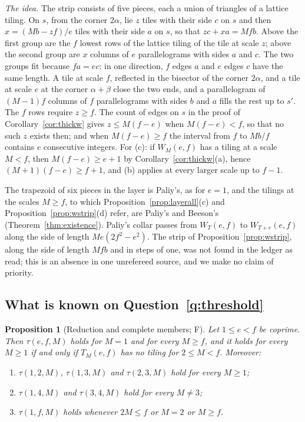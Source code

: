 \documentclass[11pt,reqno]{amsart}
\theoremstyle{plain}
\newtheorem{proposition}[theorem]{Proposition}
\theoremstyle{definition}
\newcommand{\sF}{\textup{\textsf{F}}}
\begin{document}
\emph{The idea.} The strip consists of five pieces, each a union of triangles of a lattice tiling. On $s$,
from the corner $2\alpha$, lie $z$ tiles with their side $c$ on $s$ and then $x=(Mb-zf)/e$ tiles with their
side $a$ on $s$, so that $zc+xa=Mfb$. Above the first group are the $f$ lowest rows of the lattice tiling of
the tile at scale $z$; above the second group are $x$ columns of $e$ parallelograms with sides $a$ and $c$.
The two groups fit because $fa=ec$: in one direction, $f$ edges $a$ and $e$ edges $c$ have the same length. A
tile at scale $f$, reflected in the bisector of the corner $2\alpha$, and a tile at scale $e$ at the corner
$\alpha+\beta$ close the two ends, and a parallelogram of $(M-1)f$ columns of $f$ parallelograms with sides
$b$ and $a$ fills the rest up to $s'$. The $f$ rows require $z\ge f$. The count of edges on $s$ in the proof
of Corollary~\ref{cor:thickw} gives $z\le M(f-e)$ when $M(f-e)<f$, so that no such $z$ exists then; and when
$M(f-e)\ge f$ the interval from $f$ to $Mb/f$ contains $e$ consecutive integers. For \textup{(c)}: if
$W_M(e,f)$ has a tiling at a scale $M<f$, then $M(f-e)\ge e+1$ by Corollary~\ref{cor:thickw}\textup{(a)},
hence $(M+1)(f-e)\ge f+1$, and \textup{(b)} applies at every larger scale up to $f-1$.

The trapezoid of six pieces in the layer is Paliy's, as for $e=1$, and the tilings at the scales $M\ge f$, to
which Proposition~\ref{prop:layerall}\textup{(c)} and Proposition~\ref{prop:wstrip}\textup{(d)} refer, are
Paliy's and Beeson's (Theorem~\ref{thm:existence}). Paliy's collar passes from $W_T(e,f)$ to $W_{T+e}(e,f)$
along the side of length $Me(2f^2-e^2)$. The strip of Proposition~\ref{prop:wstrip}, along the side of length
$Mfb$ and in steps of one, was not found in the ledger \cite{PaliyLedger} as read; this is an absence in one
unrefereed source, and we make no claim of priority.

\subsection{What is known on Question~\ref{q:threshold}}

\begin{proposition}[Reduction and complete members; \sF]\label{prop:finite}
Let $1\le e<f$ be coprime. Then $\tau(e,f,M)$ holds for $M=1$ and for every $M\ge f$, and it holds for every
$M\ge1$ if and only if $T_M(e,f)$ has no tiling for $2\le M<f$. Moreover:
\begin{enumerate}
\item[\textup{(i)}] $\tau(1,2,M)$, $\tau(1,3,M)$ and $\tau(2,3,M)$ hold for every $M\ge1$;
\item[\textup{(ii)}] $\tau(1,4,M)$ and $\tau(3,4,M)$ hold for every $M\ne3$;
\item[\textup{(iii)}] $\tau(1,f,M)$ holds whenever $2M\le f$ or $M=2$ or $M\ge f$.
\end{enumerate}
\end{proposition}
\end{document}
